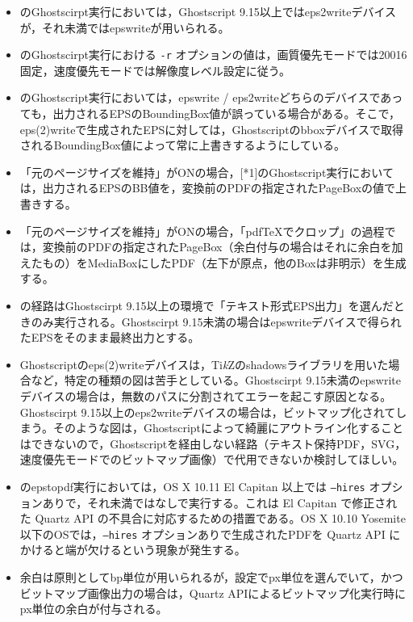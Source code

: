 \documentclass[uplatex,dvipdfmx,landscape]{jsarticle}
\newcommand*\TikZ{Ti\textit{k}Z}
\begin{document}

{\baselineskip18pt
\begin{itemize}[leftmargin=2zw]
\item\relax[*1]のGhostscirpt実行においては，Ghostscript 9.15以上ではeps2writeデバイスが，それ未満ではepswriteが用いられる。
\item\relax[*1]のGhostscirpt実行における \texttt{-r} オプションの値は，画質優先モードでは20016固定，速度優先モードでは解像度レベル設定に従う。
\item\relax[*1]のGhostscript実行においては，epswrite / eps2writeどちらのデバイスであっても，出力されるEPSのBoundingBox値が誤っている場合がある。そこで，eps(2)writeで生成されたEPSに対しては，Ghostscriptのbboxデバイスで取得されるBoundingBox値によって常に上書きするようにしている。
\item 「元のページサイズを維持」がONの場合，[*1]のGhostscript実行においては，出力されるEPSのBB値を，変換前のPDFの指定されたPageBoxの値で上書きする。
\item 「元のページサイズを維持」がONの場合，「pdf\TeX でクロップ」の過程では，変換前のPDFの指定されたPageBox（余白付与の場合はそれに余白を加えたもの）をMediaBoxにしたPDF（左下が原点，他のBoxは非明示）を生成する。
\item\relax[*2]の経路はGhostscirpt 9.15以上の環境で「テキスト形式EPS出力」を選んだときのみ実行される。Ghostscirpt 9.15未満の場合はepswriteデバイスで得られたEPSをそのまま最終出力とする。
\item Ghostscriptのeps(2)writeデバイスは，\TikZ のshadowsライブラリを用いた場合など，特定の種類の図は苦手としている。Ghostscirpt 9.15未満のepswriteデバイスの場合は，無数のパスに分割されてエラーを起こす原因となる。Ghostscirpt 9.15以上のeps2writeデバイスの場合は，ビットマップ化されてしまう。そのような図は，Ghostscriptによって綺麗にアウトライン化することはできないので，Ghostscriptを経由しない経路（テキスト保持PDF，SVG，速度優先モードでのビットマップ画像）で代用できないか検討してほしい。
\item\relax[*3]のepstopdf実行においては，OS X 10.11 El Capitan 以上では \texttt{--hires} オプションありで，それ未満ではなしで実行する。これは El Capitan で修正された Quartz API の不具合に対応するための措置である。OS X 10.10 Yosemite 以下のOSでは，\texttt{--hires} オプションありで生成されたPDFを Quartz API にかけると端が欠けるという現象が発生する。
\item 余白は原則としてbp単位が用いられるが，設定でpx単位を選んでいて，かつビットマップ画像出力の場合は，Quartz APIによるビットマップ化実行時にpx単位の余白が付与される。
\end{itemize}
}
\end{document}

